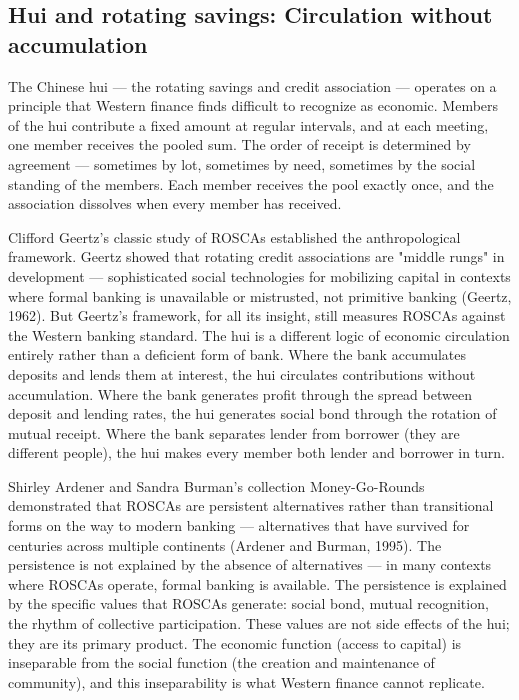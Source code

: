 \subsection{Hui and rotating savings: Circulation without accumulation}

The Chinese hui — the rotating savings and credit association — operates on a principle that Western finance finds difficult to recognize as economic. Members of the hui contribute a fixed amount at regular intervals, and at each meeting, one member receives the pooled sum. The order of receipt is determined by agreement — sometimes by lot, sometimes by need, sometimes by the social standing of the members. Each member receives the pool exactly once, and the association dissolves when every member has received.

Clifford Geertz's classic study of ROSCAs established the anthropological framework. Geertz showed that rotating credit associations are "middle rungs" in development — sophisticated social technologies for mobilizing capital in contexts where formal banking is unavailable or mistrusted, not primitive banking (Geertz, 1962). But Geertz's framework, for all its insight, still measures ROSCAs against the Western banking standard. The hui is a different logic of economic circulation entirely rather than a deficient form of bank. Where the bank accumulates deposits and lends them at interest, the hui circulates contributions without accumulation. Where the bank generates profit through the spread between deposit and lending rates, the hui generates social bond through the rotation of mutual receipt. Where the bank separates lender from borrower (they are different people), the hui makes every member both lender and borrower in turn.

Shirley Ardener and Sandra Burman's collection Money-Go-Rounds demonstrated that ROSCAs are persistent alternatives rather than transitional forms on the way to modern banking — alternatives that have survived for centuries across multiple continents (Ardener and Burman, 1995). The persistence is not explained by the absence of alternatives — in many contexts where ROSCAs operate, formal banking is available. The persistence is explained by the specific values that ROSCAs generate: social bond, mutual recognition, the rhythm of collective participation. These values are not side effects of the hui; they are its primary product. The economic function (access to capital) is inseparable from the social function (the creation and maintenance of community), and this inseparability is what Western finance cannot replicate.

